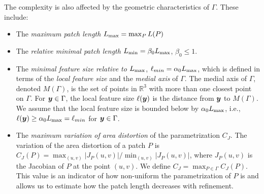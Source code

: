 The complexity is also affected by the geometric characteristics of $\Gamma$. 
These include:
\begin{itemize}
  \item The \textit{maximum patch length} $L_{\mathrm{max}} = \max_P L(P)$
  \item The \textit{relative minimal patch length} $L_{\mathrm{min}} = \beta_0 L_{\mathrm{max}}$, $\beta_0 \leq 1$.
  \item The \textit{minimal feature size relative to $L_{\mathrm{max}}$}, $\ell_{min} = \alpha_0L_{\mathrm{max}}$, which is defined in terms of the \textit{local feature size} and the \textit{medial axis} of $\Gamma$.
The medial axis of $\Gamma$, denoted $M(\Gamma)$, is the set of points in $\mathbb{R}^3$ with more than one closest point on $\Gamma$. 
For ${\bm{y}} \in\Gamma$, the local feature size  $\ell({\bm{y}})$ is the distance from ${\bm{y}}$ to $M(\Gamma)$.
We assume that the local feature size is bounded below by $\alpha_0L_{\mathrm{max}}$, i.e., $\ell({\bm{y}}) \geq \alpha_0 L_{\mathrm{max}} = \ell_{min}$ for ${\bm{y}} \in \Gamma$.
  \item The \emph{maximum variation of area distortion} of the parametrization $C_J$.
The variation of the area distortion of a patch $P$ is $C_J(P) = \max_{(u,v)} |J_P(u,v)|/\min_{(u,v)} |J_P(u,v)|$, where $J_P(u,v)$ is the Jacobian of $P$ at the point $(u,v)$. 
We define $C_J = \max_{P\in\Gamma} C_J(P)$.
This value is an indicator of how non-uniform the parametrization of $P$ is and allows us to estimate how the patch length decreases with refinement. 
\end{itemize}


